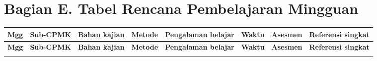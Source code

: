 \documentclass[12pt,a4paper]{article}
\begin{document}
\vspace{0.75cm}

\section*{Bagian E. Tabel Rencana Pembelajaran Mingguan}

{\small
\begin{landscape}
\setlength{\tabcolsep}{3pt}
\renewcommand{\arraystretch}{1.15}
\begin{longtable}{|p{0.55cm}|p{2.35cm}|p{2.5cm}|p{1.65cm}|p{2.55cm}|p{1.05cm}|p{1.75cm}|p{3.15cm}|}
\hline
\textbf{Mgg} & \textbf{Sub-CPMK} & \textbf{Bahan kajian} & \textbf{Metode} & \textbf{Pengalaman belajar} & \textbf{Waktu} & \textbf{Asesmen} & \textbf{Referensi singkat} \\
\hline
\endfirsthead
\hline
\textbf{Mgg} & \textbf{Sub-CPMK} & \textbf{Bahan kajian} & \textbf{Metode} & \textbf{Pengalaman belajar} & \textbf{Waktu} & \textbf{Asesmen} & \textbf{Referensi singkat} \\
\hline
\endhead
\hline
\endfoot


\end{longtable}
\end{landscape}}
\end{document}
